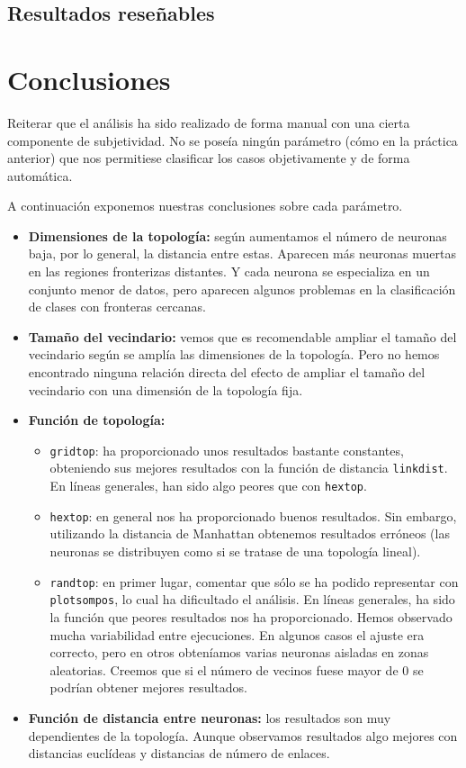 \documentclass[a4paper,12pt,titlepage]{article}
\begin{document}
\subsection{Resultados reseñables}





\section{Conclusiones}

Reiterar que el análisis ha sido realizado de forma manual con una cierta componente de subjetividad. No se poseía ningún parámetro (cómo en la práctica anterior) que nos permitiese clasificar los casos objetivamente y de forma automática.

A continuación exponemos nuestras conclusiones sobre cada parámetro.
 
\begin{itemize}[noitemsep]
	\item \textbf{Dimensiones de la topología:} según aumentamos el número de neuronas baja, por lo general, la distancia entre estas. Aparecen más neuronas muertas en las regiones fronterizas distantes. Y cada neurona se especializa en un conjunto menor de datos, pero aparecen algunos problemas en la clasificación de clases con fronteras cercanas.
	\item \textbf{Tamaño del vecindario:} vemos que es recomendable ampliar el tamaño del vecindario según se amplía las dimensiones de la topología. Pero no hemos encontrado ninguna relación directa del efecto de ampliar el tamaño del vecindario con una dimensión de la topología fija.
	\item \textbf{Función de topología:} 
	\begin{itemize}[noitemsep]
		\item \lstinline|gridtop|: ha proporcionado unos resultados bastante constantes, obteniendo sus mejores resultados con la función de distancia \lstinline|linkdist|. En líneas generales, han sido algo peores que con \lstinline|hextop|.
		\item \lstinline|hextop|: en general nos ha proporcionado buenos resultados. Sin embargo, utilizando la distancia de Manhattan obtenemos resultados erróneos (las neuronas se distribuyen como si se tratase de una topología lineal).
		\item \lstinline|randtop|: en primer lugar, comentar que sólo se ha podido representar con \lstinline|plotsompos|, lo cual ha dificultado el análisis. En líneas generales, ha sido la función que peores resultados nos ha proporcionado. Hemos observado mucha variabilidad entre ejecuciones. En algunos casos el ajuste era correcto, pero en otros obteníamos varias neuronas aisladas en zonas aleatorias. Creemos que si el número de vecinos fuese mayor de 0 se podrían obtener mejores resultados.		
	\end{itemize}
	\item \textbf{Función de distancia entre neuronas:} los resultados son muy dependientes de la topología. Aunque observamos resultados algo mejores con distancias euclídeas y distancias de número de enlaces.
\end{itemize}


\newpage


\end{document}
